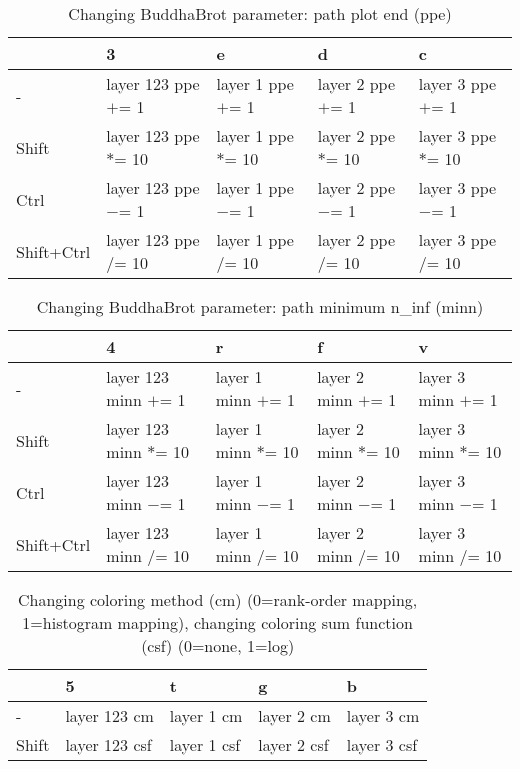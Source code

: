 \documentclass[10pt,a4paper]{article}
\begin{document}
\begin{table}[h!]
    \caption{Changing BuddhaBrot parameter: path plot end (ppe)}
    \setlength{\tabcolsep}{0.0pt}
    \begin{tabularx}{\linewidth}{LLLLL}
        \toprule
                   & 3                      & e                    & d                    & c                    \\
        \midrule
        -          & layer 123 ppe $+$= 1  & layer 1 ppe $+$= 1  & layer 2 ppe $+$= 1  & layer 3 ppe $+$= 1  \\
        Shift      & layer 123 ppe $*$= 10 & layer 1 ppe $*$= 10 & layer 2 ppe $*$= 10 & layer 3 ppe $*$= 10 \\
        Ctrl       & layer 123 ppe $-$= 1  & layer 1 ppe $-$= 1  & layer 2 ppe $-$= 1  & layer 3 ppe $-$= 1  \\
        Shift+Ctrl & layer 123 ppe $/$= 10 & layer 1 ppe $/$= 10 & layer 2 ppe $/$= 10 & layer 3 ppe $/$= 10 \\
        \bottomrule
    \end{tabularx}
\end{table}

\begin{table}[h!]
    \caption{Changing BuddhaBrot parameter: path minimum n\_inf (minn)}
    \setlength{\tabcolsep}{0.0pt}
    \begin{tabularx}{\linewidth}{LLLLL}
        \toprule
                   & 4                      & r                    & f                    & v                    \\
        \midrule
        -          & layer 123 minn $+$= 1  & layer 1 minn $+$= 1  & layer 2 minn $+$= 1  & layer 3 minn $+$= 1  \\
        Shift      & layer 123 minn $*$= 10 & layer 1 minn $*$= 10 & layer 2 minn $*$= 10 & layer 3 minn $*$= 10 \\
        Ctrl       & layer 123 minn $-$= 1  & layer 1 minn $-$= 1  & layer 2 minn $-$= 1  & layer 3 minn $-$= 1  \\
        Shift+Ctrl & layer 123 minn $/$= 10 & layer 1 minn $/$= 10 & layer 2 minn $/$= 10 & layer 3 minn $/$= 10 \\
        \bottomrule
    \end{tabularx}
\end{table}

\begin{table}[h!]
    \caption{Changing coloring method (cm) (0=rank-order mapping, 1=histogram mapping), changing coloring sum function (csf) (0=none, 1=log)}
    \setlength{\tabcolsep}{0.0pt}
    \begin{tabularx}{\linewidth}{LLLLL}
        \toprule
                   & 5             & t           & g           & b           \\
        \midrule
        -          & layer 123 cm  & layer 1 cm  & layer 2 cm  & layer 3 cm  \\
        Shift      & layer 123 csf & layer 1 csf & layer 2 csf & layer 3 csf \\
        \bottomrule
    \end{tabularx}
\end{table}
\end{document}
